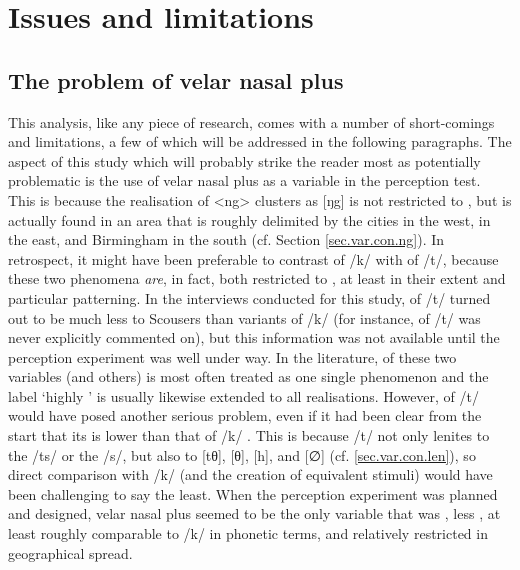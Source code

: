 	\section{Issues and limitations}
		\label{sec.perc_res.disc.issues}

		\subsection{The problem of velar nasal plus}

This analysis, like any piece of research, comes with a number of short-comings and limitations, a few of which will be addressed in the following paragraphs.
The aspect of this study which will probably strike the reader most as potentially problematic is the use of velar nasal plus as a variable in the perception test.
This is because the realisation of <ng> clusters as [ŋg] is not restricted to , but is actually found in an area that is roughly delimited by the cities  in the west,  in the east, and Birmingham in the south (cf. Section \ref{sec.var.con.ng}).
In retrospect, it might have been preferable to contrast  of /k/ with  of /t/, because these two phenomena \emph{are}, in fact, both restricted to , at least in their extent and particular patterning.
In the interviews conducted for this study,  of /t/ turned out to be much less  to Scousers than  variants of /k/ (for instance,  of /t/ was never explicitly commented on), but this information was not available until the perception experiment was well under way.
In the literature,  of these two variables (and others) is most often treated as one single phenomenon and the label `highly ' is usually likewise extended to all   realisations.
However,  of /t/ would have posed another serious problem, even if it had been clear from the start that its  is lower than that of /k/ .
This is because /t/ not only lenites to the  /ts/ or the  /s/, but also to [tθ], [θ], [h], and [∅] (cf. \ref{sec.var.con.len}), so direct comparison with /k/ (and the creation of equivalent stimuli) would have been challenging to say the least.
When the perception experiment was planned and designed, velar nasal plus seemed to be the only  variable that was , less , at least roughly comparable to /k/ in phonetic terms, and relatively restricted in geographical spread.

